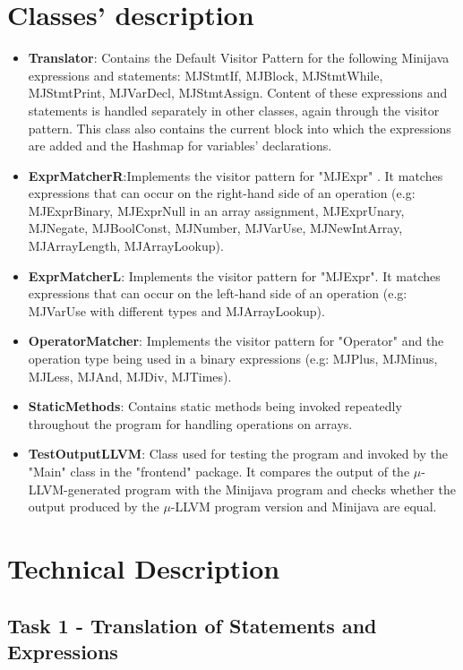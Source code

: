 \documentclass[paper=a4, fontsize=11pt]{scrartcl}
\numberwithin{equation}{section}		%
\numberwithin{figure}{section}			%
\numberwithin{table}{section}				%
\begin{document}
\section*{Classes' description}
\begin{itemize}
	\item \textbf{Translator}: Contains the Default Visitor Pattern for the following  Minijava expressions and statements: MJStmtIf, MJBlock, MJStmtWhile, MJStmtPrint, MJVarDecl, MJStmtAssign. Content of these expressions and statements is handled separately in other classes, again through the visitor pattern. This class also contains the current block into which the expressions are added and the Hashmap for variables' declarations.
	\item \textbf{ExprMatcherR}:Implements the visitor pattern for "MJExpr" . It matches expressions that can occur on the right-hand side of an operation (e.g: MJExprBinary, MJExprNull in an array assignment, MJExprUnary, MJNegate, MJBoolConst, MJNumber, MJVarUse, MJNewIntArray, MJArrayLength, MJArrayLookup). 
	\item \textbf{ExprMatcherL}: Implements the visitor pattern for "MJExpr". It matches expressions that can occur on the left-hand side of an operation (e.g: MJVarUse with different types and MJArrayLookup). 
	\item \textbf{OperatorMatcher}: Implements the visitor pattern for "Operator" and the operation type being used in a binary expressions (e.g: MJPlus, MJMinus, MJLess, MJAnd, MJDiv, MJTimes). 
	\item \textbf{StaticMethods}: Contains static methods being invoked repeatedly throughout the program for handling operations on arrays. 
	\item \textbf{TestOutputLLVM}: Class used for testing the program and invoked by the "Main" class in the "frontend" package. It compares the output of the $\mu$-LLVM-generated program with the  Minijava program and checks whether the output produced by the $\mu$-LLVM program version and Minijava are equal. 
\end{itemize}

\section*{Technical Description}

\subsection*{Task 1 - Translation of Statements and Expressions}
\end{document}
